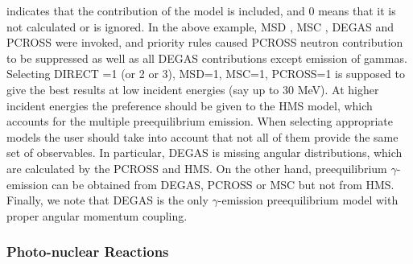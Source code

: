  indicates that the contribution of the model is included, and 0
means that it is not calculated or is ignored. In the above example, MSD%
, MSC%
, DEGAS%
 and PCROSS%
 were invoked, and priority rules caused PCROSS neutron
contribution to be suppressed as well as all DEGAS contributions except
emission of gammas. Selecting DIRECT =1 (or 2 or 3), MSD=1, MSC=1, PCROSS=1
is supposed to give the best results at low incident energies (say up to 30
MeV). At higher incident energies the preference should be given to the HMS%
 model, which accounts for the multiple preequilibrium emission.
When selecting appropriate models the user should take into account that not
all of them provide the same set of observables. In particular, DEGAS%
 is missing angular distributions, which are calculated by the
PCROSS and HMS. On the other hand, preequilibrium $\gamma$-emission can be
obtained from DEGAS, PCROSS or MSC but not from HMS. Finally, we note that
DEGAS is the only $\gamma$-emission preequilibrium model with proper angular
momentum coupling.

\subsubsection{\label{sec:photonuclear} Photo-nuclear Reactions}

